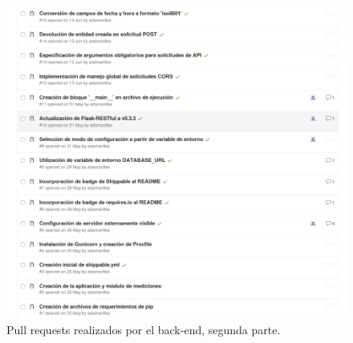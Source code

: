 \begin{figure}[h]
  \centering
  \includegraphics[width=.8\textwidth]{img/2-PR_Back}
  \caption{Pull requests realizados por el back-end, segunda parte.}
  \label{2-PR_Back}
\end{figure}

\clearpage
    
